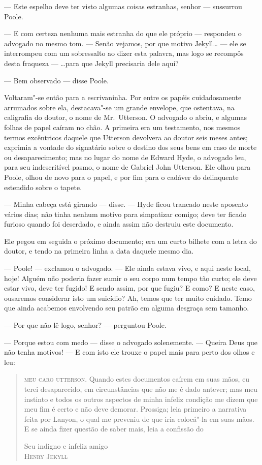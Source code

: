 --- Este espelho deve ter visto algumas coisas estranhas, senhor ---
sussurrou Poole.

--- E com certeza nenhuma mais estranha do que ele próprio --- respondeu o
advogado no mesmo tom. --- Senão vejamos, por que motivo Jekyll\ldots{} --- ele
se interrompeu com um sobressalto ao dizer esta palavra, mas logo se
recompôs desta fraqueza --- \ldots{}para que Jekyll precisaria dele aqui?   

--- Bem observado --- disse Poole.

Voltaram"-se então para a escrivaninha.  Por entre os papéis
cuidadosamente arrumados sobre ela, destacava"-se um grande envelope,
que ostentava, na caligrafia do doutor, o nome de Mr.~Utterson.  O
advogado o abriu, e algumas folhas de papel caíram no chão.  A primeira
era um testamento, nos mesmos termos excêntricos daquele que Utterson
devolvera ao doutor seis meses antes; exprimia a vontade do signatário
sobre o destino dos seus bens em caso de morte ou desaparecimento; mas
no lugar do nome de Edward Hyde, o advogado leu, para seu indescritível
pasmo, o nome de Gabriel John Utterson.  Ele olhou para Poole, olhou de
novo para o papel, e por fim para o cadáver do delinquente estendido
sobre o tapete.

--- Minha cabeça está girando --- disse. --- Hyde ficou trancado neste
aposento vários dias; não tinha nenhum motivo para simpatizar comigo;
deve ter ficado furioso quando foi deserdado, e ainda assim não
destruiu este documento. 

Ele pegou em seguida o próximo documento; era um curto bilhete com a
letra do doutor, e tendo na primeira linha a data daquele mesmo dia.

--- Poole! --- exclamou o advogado. --- Ele ainda estava vivo, e aqui neste
local, hoje!  Alguém não poderia fazer sumir o seu corpo num tempo tão
curto; ele deve estar vivo, deve ter fugido!  E sendo assim, por que
fugiu?  E como?  E neste caso, ousaremos considerar isto um suicídio? 
Ah, temos que ter muito cuidado.  Temo que ainda acabemos envolvendo
seu patrão em alguma desgraça sem tamanho.

--- Por que não lê logo, senhor? --- perguntou Poole.

--- Porque estou com medo --- disse o advogado solenemente. --- Queira Deus		\EP[1]
que não tenha motivos!  --- E com isto ele trouxe o papel mais para
perto dos olhos e leu:

\begin{quote}
\textsc{meu caro utterson}. Quando estes documentos caírem em suas mãos, eu terei
desaparecido, em circunstâncias que não me é dado antever; mas meu
instinto e todos os outros aspectos de minha infeliz condição me dizem
que meu fim é certo e não deve demorar.  Prossiga; leia primeiro a
narrativa feita por Lanyon, o qual me preveniu de que iria colocá"-la em
suas mãos.  E se ainda fizer questão de saber mais, leia a confissão do

{\raggedleft Seu indigno e infeliz amigo\\
\textsc{Henry Jekyll} \par}
\end{quote}


